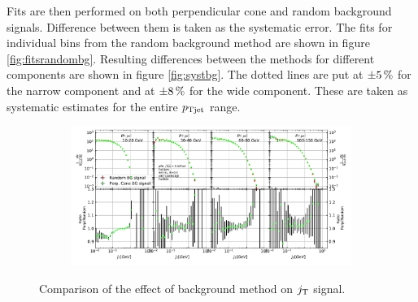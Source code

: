 
 
Fits are then performed on both perpendicular cone and random background signals. Difference between them is taken as the systematic error. The fits for individual bins from the random background method are shown in figure \ref{fig:fitsrandombg}. Resulting differences between the methods for different components are shown in figure \ref{fig:systbg}. The dotted lines are put at $\pm \unit[5]{\%}$ for the narrow component and at $\pm \unit[8]{\%}$ for the wide component. These are taken as systematic estimates for the entire $p_{\rm Tjet}$ range.

\begin{figure}[htb]
\centering
\begin{subfigure}{0.95\textwidth}
\includegraphics[width=\textwidth]{results/MixedFullJetsR04SignalBackgroundComparison.pdf}
\end{subfigure}
\caption{Comparison of the effect of background method on $j_{\rm T}$ signal.}
\label{fig:signalbg}
\end{figure}


